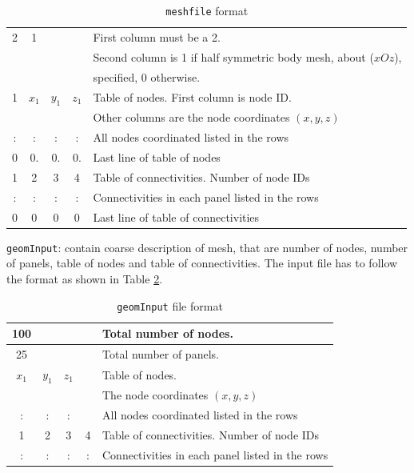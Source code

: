 \documentclass[12pt,a4paper,titlepage]{article}
\begin{document}
\begin{table}[ht]
\begin{center}
\caption{\texttt{meshfile} format}\label{tab:meshfile}
\begin{tabular}{ccccl}
\hline
2 & 1&\ &\ & First column must be a 2.\\
\ &\ &\ &\ & Second column is 1 if half symmetric body mesh, about ($xOz$),\\
\ &\ &\ &\ & specified, 0 otherwise.\\
\hline
1 & $x_1$& $y_1$ &$z_1$ & Table of nodes. First column is node ID.\\
\ &\ &\ &\ & Other columns are the node coordinates $(x,y,z)$\\
\hline
: & :&  :& : & All nodes coordinated listed in the rows\\
\hline
0 & 0.&  0.& 0.& Last line of table of nodes\\
\hline
1 & 2& 3 & 4 & Table of connectivities. Number of node IDs\\
\hline
: & :&  :& : & Connectivities in each panel listed in the rows\\
\hline
0 & 0&  0& 0& Last line of table of connectivities\\
\hline
\end{tabular}
\end{center}
\end{table}

\noindent
\texttt{geomInput}: contain coarse description of mesh, that are number of nodes, number of panels, table of nodes and table of connectivities. The input file has to follow the format as shown in Table \ref{tab:geomInput}.\\

\begin{table}[ht]
\begin{center}
\caption{\texttt{geomInput} file format}\label{tab:geomInput}
\begin{tabular}{ccccl}
\hline
100 &\ &\ &\ & Total number of nodes.\\
\hline
25 &\ &\ &\ & Total number of panels.\\
\hline
$x_1$& $y_1$ &$z_1$ &\ &Table of nodes. \\
\    &\      &\     &\ & The node coordinates $(x,y,z)$\\
\hline
 :& :&  :&\ & All nodes coordinated listed in the rows\\
\hline
1 & 2& 3 & 4 & Table of connectivities. Number of node IDs\\
\hline
: & :&  :& : & Connectivities in each panel listed in the rows\\
\hline
\end{tabular}
\end{center}
\end{table}
\end{document}

